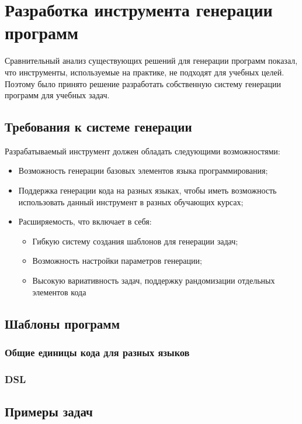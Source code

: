 \section{Разработка инструмента генерации программ}
Сравнительный анализ существующих решений для генерации программ показал, что
инструменты, используемые на практике, не подходят для учебных целей. Поэтому было принято решение
разработать собственную систему генерации программ для учебных задач.

\subsection{Требования к системе генерации}
Разрабатываемый инструмент должен обладать следующими возможностями:
\begin{itemize}
    \item Возможность генерации базовых элементов языка программирования;
    \item Поддержка генерации кода на разных языках, чтобы иметь возможность использовать данный
          инструмент в разных обучающих курсах;
    \item Расширяемость, что включает в себя:
          \begin{itemize}
              \item Гибкую систему создания шаблонов для генерации задач;
              \item Возможность настройки параметров генерации;
              \item Высокую вариативность задач, поддержку рандомизации отдельных элементов кода
          \end{itemize}
\end{itemize}

\subsection{Шаблоны программ}
\subsubsection{Общие единицы кода для разных языков}
\subsubsection{DSL}
\subsection{Примеры задач}
